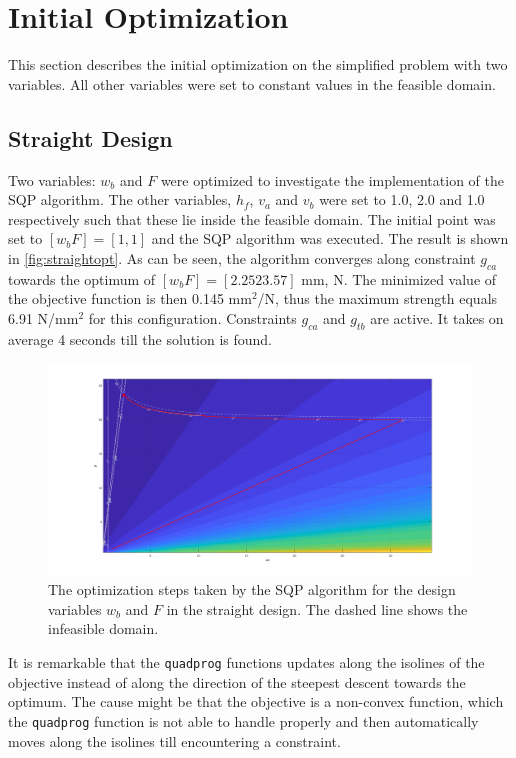 \section{Initial Optimization}
This section describes the initial optimization on the simplified problem with two variables. All other variables were set to constant values in the feasible domain. 
\subsection{Straight Design}
Two variables: $w_b$ and $F$ were optimized to investigate the implementation of the SQP algorithm. The other variables, $h_f$, $v_a$ and $v_b$ were set to 1.0, 2.0 and 1.0 respectively such that these lie inside the feasible domain. The initial point was set to $[w_b F] = [1, 1]$ and the SQP algorithm was executed. The result is shown in \autoref{fig:straightopt}. As can be seen, the algorithm converges along constraint $g_{ca}$ towards the optimum of $[w_b F] = [2.25 23.57]$ mm, N. The minimized value of the objective function is then 0.145 mm$^2$/N, thus the maximum strength equals 6.91 N/mm$^2$ for this configuration. Constraints $g_{ca}$ and $g_{tb}$ are active. It takes on average 4 seconds till the solution is found. 


\begin{figure}[H]
	\centering
	\includegraphics[width=\columnwidth]{sources/plots/straight2var.png}
	\caption{The optimization steps taken by the SQP algorithm for the design variables $w_b$ and $F$ in the straight design. The dashed line shows the infeasible domain.}
	\label{fig:straightopt}
\end{figure}

It is remarkable that the \texttt{quadprog} functions updates along the isolines of the objective instead of along the direction of the steepest descent towards the optimum. The cause might be that the objective is a non-convex function, which the \texttt{quadprog} function is not able to handle properly and then automatically moves along the isolines till encountering a constraint.

